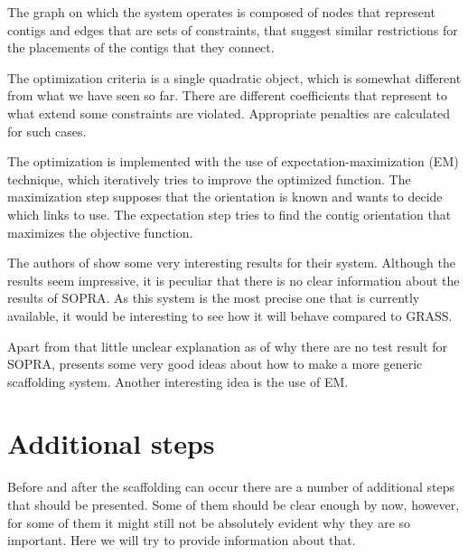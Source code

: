 \documentclass[11pt]{article}
\begin{document}
The graph on which the system operates is composed of nodes that represent
contigs and edges that are sets of constraints, that suggest similar
restrictions for the placements of the contigs that they connect.

The optimization criteria is a single quadratic object, which is somewhat
different from what we have seen so far. There are different coefficients that
represent to what extend some constraints are violated. Appropriate penalties
are calculated for such cases.

The optimization is implemented with the use of expectation-maximization (EM)
technique, which iteratively tries to improve the optimized function. The
maximization step supposes that the orientation is known and wants to decide
which links to use. The expectation step tries to find the contig orientation
that maximizes the objective function.

The authors of \cite{grass} show some very interesting results for their system.
Although the results seem impressive, it is peculiar that there is no clear
information about the results of SOPRA. As this system is the most precise one
that is currently available, it would be interesting to see how it will behave
compared to GRASS.

Apart from that little unclear explanation as of why there are no test result
for SOPRA, \cite{grass} presents some very good ideas about how to make a more
generic scaffolding system. Another interesting idea is the use of EM.



\section{Additional steps} %
\label{sec:Additional steps}
Before and after the scaffolding can occur there are a number of additional
steps that should be presented. Some of them should be clear enough by now,
however, for some of them it might still not be absolutely evident why they are
so important. Here we will try to provide information about that.
\end{document}
